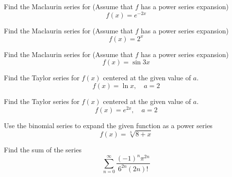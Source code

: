 \documentclass[
  course = {{MATH102 Calculus II}},
  quartile = {{2}},
  assignment = 26,%
  topic = {{11.10: Taylor and Maclaurin Series}},
  firstexercise = 1,
  term = 202
]{aga-homework}
\begin{document}

\newpage

\problem Find the Maclaurin series for (Assume that $f$ has a power series expansion) $$\displaystyle f(x)=e^{-2x}$$

\newpage

\problem Find the Maclaurin series for (Assume that $f$ has a power series expansion) $$\displaystyle f(x)=2^{x}$$

\newpage

\problem Find the Maclaurin series for (Assume that $f$ has a power series expansion) $$\displaystyle f(x)=\sin 3x $$

\newpage

\problem Find the Taylor series for $f(x)$ centered at the given value of $a$.
$$f(x)=\ln x, \quad a=2$$

\newpage

\problem Find the Taylor series for $f(x)$ centered at the given value of $a$.
$$f(x)=e^{2x}, \quad a=2$$

\newpage

\problem Use the binomial series to expand the given function as a power series
$$ f(x)=\sqrt[3]{8+x}$$

\newpage

\problem Find the sum of the series
$$\sum_{n=0}^{\infty} \frac{(-1)^n\pi^{2n}}{6^{2n}(2n)!}$$
\newpage
\afterpage{\null\newpage}

\afterpage{\null\newpage}

\afterpage{\null\newpage}
\end{document}
